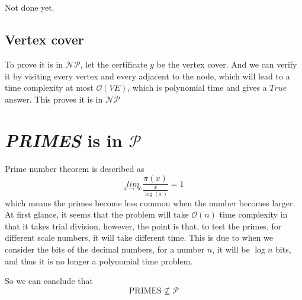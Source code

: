 \documentclass[A4paper]{article}
\begin{document}
\subsection{}
Not done yet.
\subsection{Vertex cover}
To prove it is in $\mathcal{NP}$, let the certificate $y$ be the vertex cover. And we can verify it by visiting every vertex and every adjacent to the node, which will lead to a time complexity at most $\mathcal{O}(VE)$, which is polynomial time and gives a $True$ answer. This proves it is in $\mathcal{NP}$
\section{\textit{PRIMES} is in $\mathcal{P}$}
Prime number theorem is described as
\[
	\underset{x\rightarrow \infty}{lim} \frac{\pi(x)}{\frac{x}{\log(x)}} = 1
\]
which means the primes become less common when the number becomes larger. At first glance, it seems that the problem will take $\mathcal{O}(n)$ time complexity in that it takes trial division, however, the point is that, to test the primes, for different scale numbers, it will take different time. This is due to when we consider the bits of the decimal numbers, for a number $n$, it will be $\log n$ bits, and thus it is no longer a polynomial time problem.
\par So we can conclude that
\[
	\text{PRIMES} \nsubseteq \mathcal{P}
\]
\end{document}
